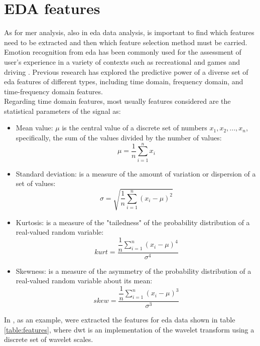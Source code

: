 \section{EDA features}
As for \gls{mer} analysis, also in \gls{eda} data analysis, is important to find which features need to be extracted and then which feature selection method must be carried.
\\ \indent
Emotion recognition from \gls{eda} has been commonly used for the assessment of user's experience in a variety of contexts such as recreational and games \cite{drachen2010correlation} and driving \cite{healey2005detecting}. Previous research has explored the predictive power of a diverse set of \gls{eda} features of different types, including time domain, frequency domain, and time-frequency domain features.
\\ \indent
Regarding time domain features, most usually features considered are the statistical parameters of the signal as:
\begin{itemize}
	\item Mean value: $\mu$ is the central value of a discrete set of numbers $x_1,x_2,...,x_n$, specifically, the sum of the values divided by the number of values:
		\begin{equation}
		\mu=\dfrac{1}{n} \sum_{i=1}^{n}{x_i}
		\end{equation}
	\item Standard deviation:  is a measure of the amount of variation or dispersion of a set of values:
		\begin{equation}
		\sigma=\sqrt{\dfrac{1}{n}\sum_{i=1}^{n}({x_i-\mu})^2}
		\end{equation}
	\item Kurtosis: is a measure of the "tailedness" of the probability distribution of a real-valued random variable:
		\begin{equation}
		kurt=\dfrac{\dfrac{1}{n} \sum_{i=1}^{n}{(x_i-\mu)^4}}{\sigma^4}
		\end{equation}
	\item Skewness: is a measure of the asymmetry of the probability distribution of a real-valued random variable about its mean:
		\begin{equation}
		skew=\dfrac{\dfrac{1}{n} \sum_{i=1}^{n}{(x_i-\mu)^3}}{\sigma^3}
		\end{equation}
\end{itemize}
In \cite{shukla2019feature}, as an example, were extracted the features for \gls{eda} data shown in table \ref{table:features}, where \gls{dwt} is an implementation of the wavelet transform using a discrete set of wavelet scales.

